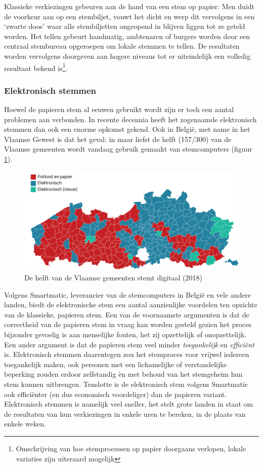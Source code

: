 			Klassieke verkiezingen gebeuren aan de hand van een stem op papier: Men duidt de voorkeur aan op een stembiljet, vouwt het dicht en werp dit vervolgens in een `zwarte doos' waar alle stembiljetten ongeopend in blijven liggen tot ze geteld worden. Het tellen gebeurt handmatig, ambtenaren of burgers worden door een centraal stembureau opgeroepen om lokale stemmen te tellen. De resultaten worden vervolgens doorgeven aan hogere niveaus tot er uiteindelijk een volledig resultaat bekend is\footnote{ Omschrijving van hoe stemprocessen op papier doorgaans verlopen, lokale variaties zijn uiteraard mogelijk}.
			
			\subsubsection{Elektronisch stemmen}
			Hoewel de papieren stem al eeuwen gebruikt wordt zijn er toch een aantal problemen aan verbonden. In recente decennia heeft het zogenaamde elektronisch stemmen dan ook een enorme opkomst gekend. Ook in België, met name in het Vlaamse Gewest is dat het geval: in maar liefst de helft (157/300) van de Vlaamse gemeenten wordt vandaag gebruik gemaakt van stemcomputers (figuur \ref{fig:evote_vlaanderen}).
			
			\begin{figure}
				\includegraphics[width=\linewidth]{img/evote_vlaanderen.png}
				\caption{De helft van de Vlaamse gemeenten stemt digitaal (2018)}
				\label{fig:evote_vlaanderen}
			\end{figure}
			
			Volgens Smartmatic, leverancier van de stemcomputers in België en vele andere landen, biedt de elektronische stem een aantal aanzienlijke voordelen ten opzichte van de klassieke, papieren stem. Een van de voornaamste argumenten is dat de correctheid van de papieren stem in vraag kan worden gesteld gezien het proces bijzonder gevoelig is aan menselijke fouten, het zij opzettelijk of onopzettelijk. Een ander argument is dat de papieren stem veel minder \textit{toegankelijk} en \textit{efficiënt} is. Elektronisch stemmen daarentegen zou het stemproces voor vrijwel iedereen toegankelijk maken, ook personen met een lichamelijke of verstandelijke beperking zouden erdoor zelfstandig èn met behoud van het stemgeheim hun stem kunnen uitbrengen. Tenslotte is de elektronisch stem volgens Smartmatic ook efficiënter (en dus economisch voordeliger) dan de papieren variant. Elektronisch stemmen is namelijk veel sneller, het stelt grote landen in staat om de resultaten van hun verkiezingen in enkele uren te bereken, in de plaats van enkele weken.
			
